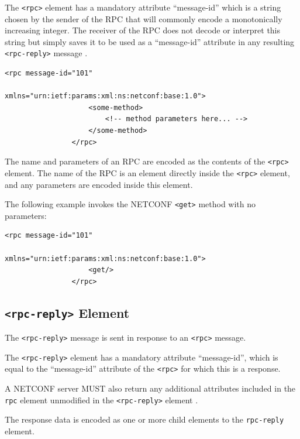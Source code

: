 The \texttt{<rpc>} element has a mandatory attribute ``message-id'' which is a string chosen by the sender of the RPC that will commonly encode a monotonically increasing integer. The receiver of the RPC does not decode or interpret this string but simply saves it to be used as a ``message-id'' attribute in any resulting \texttt{<rpc-reply>} message \cite{RFC6241N8}. 

\begin{lstlisting}[style=xmlStyle, caption={\texttt{<rpc>} Model.}, backgroundcolor=\color{codebackground}]
                <rpc message-id="101"
                        xmlns="urn:ietf:params:xml:ns:netconf:base:1.0">
                    <some-method>
                        <!-- method parameters here... -->
                    </some-method>
                </rpc>             
\end{lstlisting}

The name and parameters of an RPC are encoded as the contents of the \texttt{<rpc>} element. The name of the RPC is an element directly inside the \texttt{<rpc>} element, and any parameters are encoded inside this element.

The following example invokes the NETCONF \texttt{<get>} method with no parameters:

\begin{lstlisting}[style=xmlStyle, caption={\texttt{<rpc>} \texttt{<get>} Model.}, backgroundcolor=\color{codebackground}]
                <rpc message-id="101"
                        xmlns="urn:ietf:params:xml:ns:netconf:base:1.0">
                    <get/>
                </rpc>           
\end{lstlisting}




\subsection{\texttt{<rpc-reply>} Element}


The \texttt{<rpc-reply>} message is sent in response to an \texttt{<rpc>} message.

The \texttt{<rpc-reply>} element has a mandatory attribute ``message-id'', which is equal to the ``message-id'' attribute of the \texttt{<rpc>} for which this is a response.

A NETCONF server MUST also return any additional attributes included in the \texttt{rpc} element unmodified in the \texttt{<rpc-reply>} element \cite{RFC6241N8}.

The response data is encoded as one or more child elements to the \texttt{rpc-reply} element.

